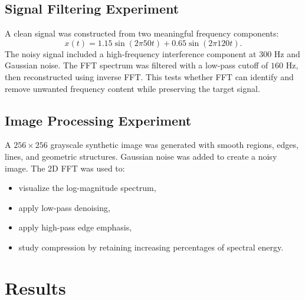\documentclass{zc-ust-hw}
\begin{document}
\subsection{Signal Filtering Experiment}
A clean signal was constructed from two meaningful frequency components:
\[
x(t)=1.15\sin(2\pi 50t)+0.65\sin(2\pi 120t).
\]
The noisy signal included a high-frequency interference component at \(300\) Hz and Gaussian noise. The FFT spectrum was filtered with a low-pass cutoff of \(160\) Hz, then reconstructed using inverse FFT. This tests whether FFT can identify and remove unwanted frequency content while preserving the target signal.

\subsection{Image Processing Experiment}
A \(256\times256\) grayscale synthetic image was generated with smooth regions, edges, lines, and geometric structures. Gaussian noise was added to create a noisy image. The 2D FFT was used to:
\begin{itemize}
    \item visualize the log-magnitude spectrum,
    \item apply low-pass denoising,
    \item apply high-pass edge emphasis,
    \item study compression by retaining increasing percentages of spectral energy.
\end{itemize}

\section{Results}
\end{document}
